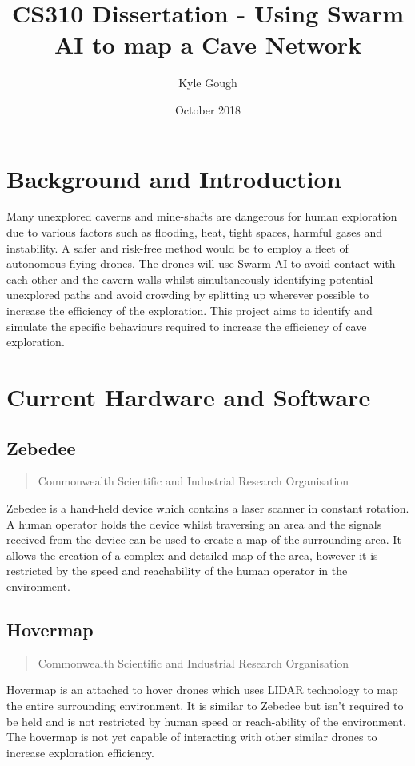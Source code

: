 \documentclass{article}
\title{CS310 Dissertation - Using Swarm AI to map a Cave Network}
\author{Kyle Gough}
\date{October 2018}
\begin{document}
\maketitle

\tableofcontents

\section{Background and Introduction}

Many unexplored caverns and mine-shafts are dangerous for human exploration due to various factors such as flooding, heat, tight spaces, harmful gases and instability. A safer and risk-free method would be to employ a fleet of autonomous flying drones. The drones will use Swarm AI to avoid contact with each other and the cavern walls whilst simultaneously identifying potential unexplored paths and avoid crowding by splitting up wherever possible to increase the efficiency of the exploration. This project aims to identify and simulate the specific behaviours required to increase the efficiency of cave exploration.

\section{Current Hardware and Software}

\subsection*{Zebedee}
\begin{quote}
    Commonwealth Scientific and Industrial Research Organisation
\end{quote}
Zebedee is a hand-held device which contains a laser scanner in constant rotation. A human operator holds the device whilst traversing an area and the signals received from the device can be used to create a map of the surrounding area. It allows the creation of a complex and detailed map of the area, however it is restricted by the speed and reachability of the human operator in the environment.

\subsection*{Hovermap}
\begin{quote}
    Commonwealth Scientific and Industrial Research Organisation
\end{quote}
Hovermap is an attached to hover drones which uses LIDAR technology to map the entire surrounding environment. It is similar to Zebedee but isn't required to be held and is not restricted by human speed or reach-ability of the environment. The hovermap is not yet capable of interacting with other similar drones to increase exploration efficiency.
\end{document}
